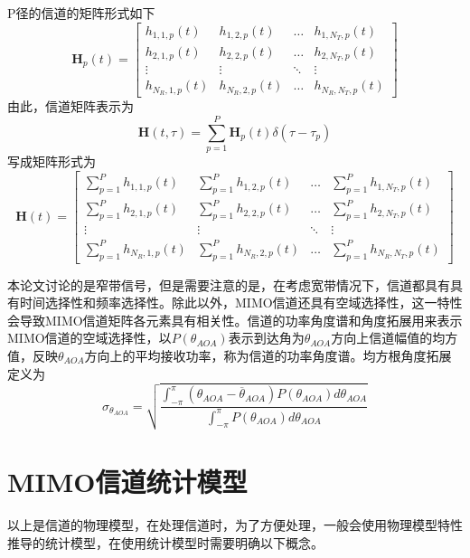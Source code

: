 \documentclass[bachelor,nocolorlinks, printoneside]{seuthesis} %
\begin{document}
\begin{Main}
P径的信道的矩阵形式如下
\begin{equation}\label{key}
\mathbf{H}_{p}(t) = \left[ \begin{array}{cccc}
h_{1,1,p}(t) & h_{1,2,p}(t) & \ldots & h_{1,N_{T},p}(t) \\
h_{2,1,p}(t) & h_{2,2,p}(t) & \ldots & h_{2,N_{T},p}(t) \\
\vdots & \vdots & \ddots & \vdots \\
h_{N_{R},1,p}(t) & h_{N_{R},2,p}(t) & \ldots & h_{N_{R},N_{T},p}(t)
\end{array} \right] 
\end{equation}
由此，信道矩阵表示为
\begin{equation}\label{key}
\mathbf{H}(t,\tau) = \sum_{p=1}^{P}\mathbf{H}_{p}(t)\delta(\tau-\tau_{p})
\end{equation}
写成矩阵形式为
\begin{equation}\label{key}
\mathbf{H}(t) = \left[ \begin{array}{cccc}
\sum_{p=1}^{P}h_{1,1,p}(t) & \sum_{p=1}^{P}h_{1,2,p}(t) & \ldots & \sum_{p=1}^{P}h_{1,N_{T},p}(t) \\
\sum_{p=1}^{P}h_{2,1,p}(t) & \sum_{p=1}^{P}h_{2,2,p}(t) & \ldots & \sum_{p=1}^{P}h_{2,N_{T},p}(t) \\
\vdots & \vdots & \ddots & \vdots \\
\sum_{p=1}^{P}h_{N_{R},1,p}(t) & \sum_{p=1}^{P}h_{N_{R},2,p}(t) & \ldots & \sum_{p=1}^{P}h_{N_{R},N_{T},p}(t)
\end{array} \right]
\end{equation}

本论文讨论的是窄带信号，但是需要注意的是，在考虑宽带情况下，信道都具有具有时间选择性和频率选择性。除此以外，MIMO信道还具有空域选择性，这一特性会导致MIMO信道矩阵各元素具有相关性。信道的功率角度谱和角度拓展用来表示MIMO信道的空域选择性，以$P(\theta_{AOA})$表示到达角为$\theta_{AOA}$方向上信道幅值的均方值，反映$\theta_{AOA}$方向上的平均接收功率，称为信道的功率角度谱。均方根角度拓展定义为
\begin{equation}\label{key}
\sigma_{\theta_{AOA}}=\sqrt{
	\frac{\int_{-\pi}^{\pi}(\theta_{AOA}-\overline{\theta}_{AOA})P(\theta_{AOA})d\theta_{AOA}}
	{\int_{-\pi}^{\pi}P(\theta_{AOA})d\theta_{AOA}}
}
\end{equation}

\section{MIMO信道统计模型}
以上是信道的物理模型，在处理信道时，为了方便处理，一般会使用物理模型特性推导的统计模型，在使用统计模型时需要明确以下概念。


\end{Main}
\end{document}

